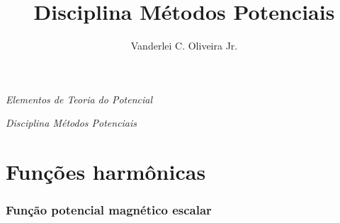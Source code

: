 \documentclass[10pt,a4paper,fleqn]{article}
\title{Disciplina M\'{e}todos Potenciais}
\author{Vanderlei C. Oliveira Jr.}
\date{}
\begin{document}
\begin{center}

\begin{huge}
\emph{Elementos de Teoria do Potencial}
\end{huge}

\bigskip
\bigskip

\begin{large}
\emph{Disciplina M\'{e}todos Potenciais}
\end{large}

\end{center}

\bigskip
\bigskip

\begin{center}


\end{center}

\clearpage

\tableofcontents

\clearpage

\part{Fun\c{c}\~{o}es harm\^{o}nicas}

\section{Fun\c{c}\~{a}o potencial magn\'{e}tico escalar}
\end{document}
